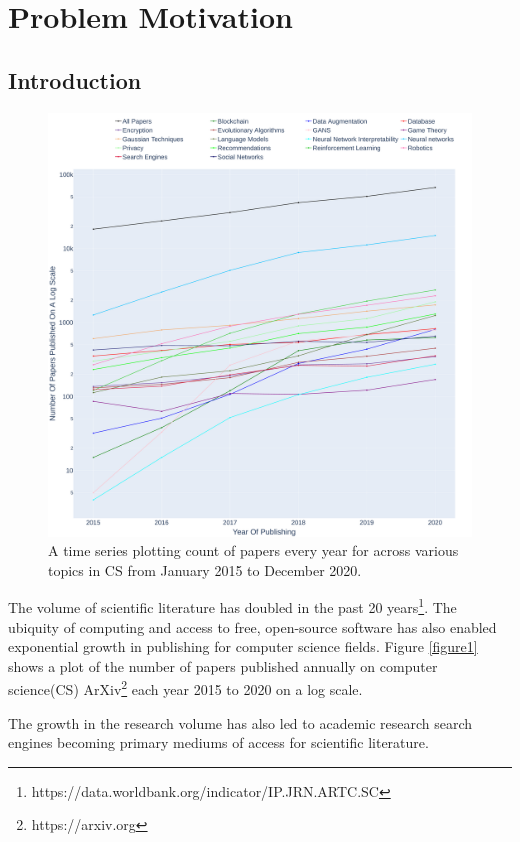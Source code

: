 \chapter{Problem Motivation}

\section{Introduction}    
\begin{figure}[h]
    \centering
    \includegraphics[width=\maxwidth{\textwidth}]{src/images/Paper-Publishing-Trend.pdf}
    \caption{ A time series plotting count of papers every year for across various topics in CS from January 2015 to December 2020. }
    \label{figure\arabic{figurecounter}}
\end{figure}

The volume of scientific literature has doubled in the past 20 years\footnote{https://data.worldbank.org/indicator/IP.JRN.ARTC.SC}.  
The ubiquity of computing and access to free, open-source software has also enabled exponential growth in publishing for computer science fields.  
Figure \ref{figure1} shows a plot of the number of papers published annually on computer science(CS) ArXiv\footnote{https://arxiv.org} each year 2015 to 2020 on a log scale. 


The growth in the research volume has also led to academic research search engines becoming primary mediums of access for scientific literature. 

